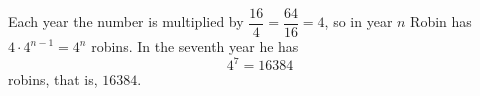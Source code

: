 Each year the number is multiplied by $\dfrac{16}{4}=\dfrac{64}{16}=4$, so in year $n$ Robin has $4\cdot4^{n-1}=4^n$ robins. In the seventh year he has
\[
4^7=16384
\]
robins, that is, $\boxed{16384}$.
